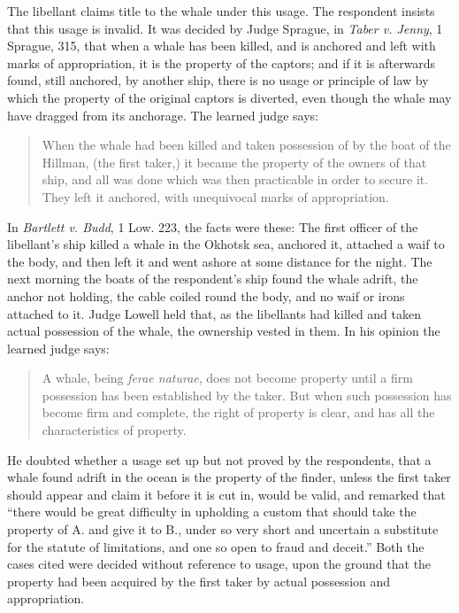 The libellant claims title to the whale under this usage. The respondent insists
that this usage is invalid. It was decided by Judge Sprague, in \emph{Taber v.
Jenny}, 1 Sprague, 315, that when a whale has been killed, and is anchored and
left with marks of appropriation, it is the property of the captors; and if it
is afterwards found, still anchored, by another ship, there is no usage or
principle of law by which the property of the original captors is diverted, even
though the whale may have dragged from its anchorage. The learned judge says:
\begin{quote}
When the whale had been killed and taken possession of by the boat of the
Hillman, (the first taker,) it became the property of the owners of that ship,
and all was done which was then practicable in order to secure it. They left it
anchored, with unequivocal marks of appropriation.
\end{quote}

In \emph{Bartlett v. Budd}, 1 Low. 223, the facts were these: The first officer
of the libellant's ship killed a whale in the Okhotsk sea, anchored it, attached
a waif to the body, and then left it and went
ashore at some distance for the night. The next morning the boats of the
respondent's ship found the whale adrift, the anchor not holding, the cable
coiled round the body, and no waif or irons attached to it. Judge Lowell held
that, as the libellants had killed and taken actual possession of the whale, the
ownership vested in them. In his opinion the learned judge says:
\begin{quote}
A whale, being \textit{ferae naturae}, does not become property until a firm
possession has been established by the taker. But when such possession has
become firm and complete, the right of property is clear, and has all the
characteristics of property.
\end{quote}

He doubted whether a usage set up but not proved by the respondents, that a
whale found adrift in the ocean is the property of the finder, unless the first
taker should appear and claim it before it is cut in, would be valid, and
remarked that ``there would be great difficulty in upholding a custom that
should
take the property of A. and give it to B., under so very short and uncertain a
substitute for the statute of limitations, and one so open to fraud and
deceit.''
Both the cases cited were decided without reference to usage, upon the ground
that the property had been acquired by the first taker by actual possession and
appropriation.

